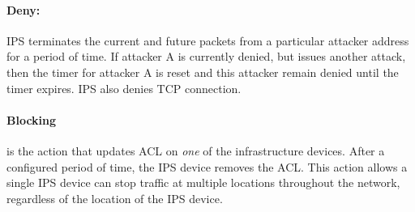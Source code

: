 \paragraph{Deny:} IPS terminates the current and future packets from a particular attacker address for a period of time. If attacker A is currently denied, but issues another attack, then the timer for attacker A is reset and this attacker remain denied until the timer expires. IPS also denies TCP connection.


\paragraph{Blocking} is the action that updates ACL on \emph{one} of the infrastructure devices. After a configured period of time, the IPS device removes the ACL. This action allows a single IPS device can stop traffic at multiple locations throughout the network, regardless of the location of the IPS device. 

%
%

